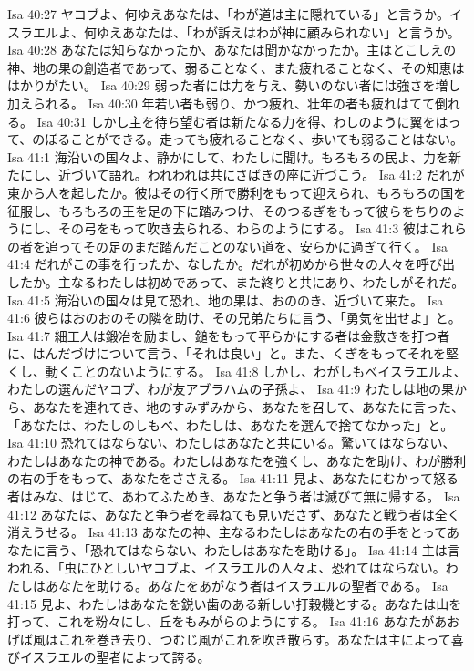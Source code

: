 Isa 40:27  ヤコブよ、何ゆえあなたは、「わが道は主に隠れている」と言うか。イスラエルよ、何ゆえあなたは、「わが訴えはわが神に顧みられない」と言うか。
Isa 40:28  あなたは知らなかったか、あなたは聞かなかったか。主はとこしえの神、地の果の創造者であって、弱ることなく、また疲れることなく、その知恵ははかりがたい。
Isa 40:29  弱った者には力を与え、勢いのない者には強さを増し加えられる。
Isa 40:30  年若い者も弱り、かつ疲れ、壮年の者も疲れはてて倒れる。
Isa 40:31  しかし主を待ち望む者は新たなる力を得、わしのように翼をはって、のぼることができる。走っても疲れることなく、歩いても弱ることはない。
Isa 41:1  海沿いの国々よ、静かにして、わたしに聞け。もろもろの民よ、力を新たにし、近づいて語れ。われわれは共にさばきの座に近づこう。
Isa 41:2  だれが東から人を起したか。彼はその行く所で勝利をもって迎えられ、もろもろの国を征服し、もろもろの王を足の下に踏みつけ、そのつるぎをもって彼らをちりのようにし、その弓をもって吹き去られる、わらのようにする。
Isa 41:3  彼はこれらの者を追ってその足のまだ踏んだことのない道を、安らかに過ぎて行く。
Isa 41:4  だれがこの事を行ったか、なしたか。だれが初めから世々の人々を呼び出したか。主なるわたしは初めであって、また終りと共にあり、わたしがそれだ。
Isa 41:5  海沿いの国々は見て恐れ、地の果は、おののき、近づいて来た。
Isa 41:6  彼らはおのおのその隣を助け、その兄弟たちに言う、「勇気を出せよ」と。
Isa 41:7  細工人は鍛冶を励まし、鎚をもって平らかにする者は金敷きを打つ者に、はんだづけについて言う、「それは良い」と。また、くぎをもってそれを堅くし、動くことのないようにする。
Isa 41:8  しかし、わがしもべイスラエルよ、わたしの選んだヤコブ、わが友アブラハムの子孫よ、
Isa 41:9  わたしは地の果から、あなたを連れてき、地のすみずみから、あなたを召して、あなたに言った、「あなたは、わたしのしもべ、わたしは、あなたを選んで捨てなかった」と。
Isa 41:10  恐れてはならない、わたしはあなたと共にいる。驚いてはならない、わたしはあなたの神である。わたしはあなたを強くし、あなたを助け、わが勝利の右の手をもって、あなたをささえる。
Isa 41:11  見よ、あなたにむかって怒る者はみな、はじて、あわてふためき、あなたと争う者は滅びて無に帰する。
Isa 41:12  あなたは、あなたと争う者を尋ねても見いださず、あなたと戦う者は全く消えうせる。
Isa 41:13  あなたの神、主なるわたしはあなたの右の手をとってあなたに言う、「恐れてはならない、わたしはあなたを助ける」。
Isa 41:14  主は言われる、「虫にひとしいヤコブよ、イスラエルの人々よ、恐れてはならない。わたしはあなたを助ける。あなたをあがなう者はイスラエルの聖者である。
Isa 41:15  見よ、わたしはあなたを鋭い歯のある新しい打穀機とする。あなたは山を打って、これを粉々にし、丘をもみがらのようにする。
Isa 41:16  あなたがあおげば風はこれを巻き去り、つむじ風がこれを吹き散らす。あなたは主によって喜びイスラエルの聖者によって誇る。
